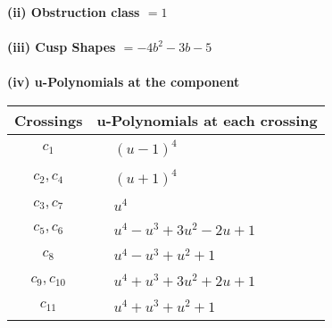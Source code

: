 \documentclass[1p]{elsarticle_modified}
\theoremstyle{definition}
\begin{document}
\flushleft \textbf{(ii) Obstruction class $= 1$}\\~\\
\flushleft \textbf{(iii) Cusp Shapes $= -4 b^2-3 b-5$}\\~\\
\newpage\renewcommand{\arraystretch}{1}
\flushleft \textbf{(iv) u-Polynomials at the component}\newline \\
\begin{tabular}{m{50pt}|m{274pt}}
Crossings & \hspace{64pt}u-Polynomials at each crossing \\
\hline $$\begin{aligned}c_{1}\end{aligned}$$&$\begin{aligned}
&(u-1)^4
\end{aligned}$\\
\hline $$\begin{aligned}c_{2},c_{4}\end{aligned}$$&$\begin{aligned}
&(u+1)^4
\end{aligned}$\\
\hline $$\begin{aligned}c_{3},c_{7}\end{aligned}$$&$\begin{aligned}
&u^4
\end{aligned}$\\
\hline $$\begin{aligned}c_{5},c_{6}\end{aligned}$$&$\begin{aligned}
&u^4- u^3+3 u^2-2 u+1
\end{aligned}$\\
\hline $$\begin{aligned}c_{8}\end{aligned}$$&$\begin{aligned}
&u^4- u^3+u^2+1
\end{aligned}$\\
\hline $$\begin{aligned}c_{9},c_{10}\end{aligned}$$&$\begin{aligned}
&u^4+u^3+3 u^2+2 u+1
\end{aligned}$\\
\hline $$\begin{aligned}c_{11}\end{aligned}$$&$\begin{aligned}
&u^4+u^3+u^2+1
\end{aligned}$\\
\hline
\end{tabular}\\~\\
\end{document}

